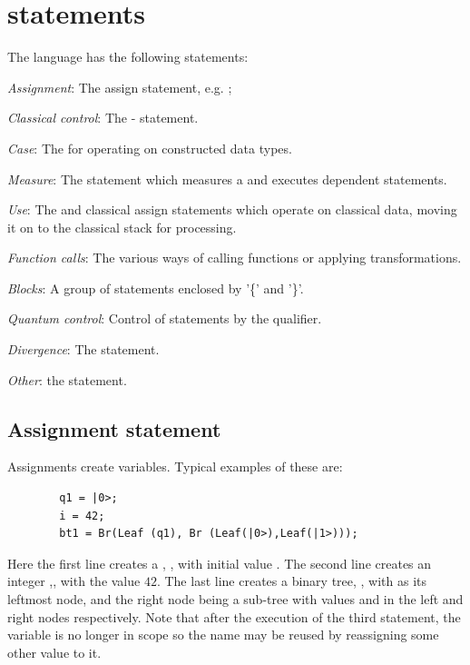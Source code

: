 \section{\lqpl{} statements}\label{sec:lqplstatements}
The \lqpl{} language has  the following statements:
\begin{description}
\item{\emph{Assignment}:} The assign statement, e.g. ;
\item{\emph{Classical control}:} The
 -  statement.
\item{\emph{Case}:} The  for operating on constructed
data types.
\item{\emph{Measure}:} The  statement which measures
a \qbit{} and executes dependent statements.
\item{\emph{Use}:} The
 and classical assign statements which operate on classical
data, moving it on to the classical stack for processing.
\item{\emph{Function calls}:} The various ways of calling functions or applying
transformations.
\item{\emph{Blocks}:} A group
of statements enclosed by '\{' and '\}'.
\item{\emph{Quantum control}:} Control of statements by 
 the \inlqpl{<=} qualifier.
\item{\emph{Divergence}:} The  statement.
\item{\emph{Other}:} the  statement.
\end{description}
\subsection{Assignment statement}\label{subsec:assignmentstatement}
Assignments create variables. Typical
examples of these are:
\begin{lstlisting}
        q1 = |0>;
        i = 42;
        bt1 = Br(Leaf (q1), Br (Leaf(|0>),Leaf(|1>)));
\end{lstlisting}
Here the first line creates a \qbit{}, , 
with initial value . The
second line creates an integer ,,
  with the value $42$. The last line creates a
binary tree, ,
 with  as its leftmost node, and the right node
being a sub-tree with values  and  in the left and 
right nodes respectively. Note that after the execution of the 
third statement, the variable  is no longer in scope so the
name may be reused by  reassigning some other value to it.

